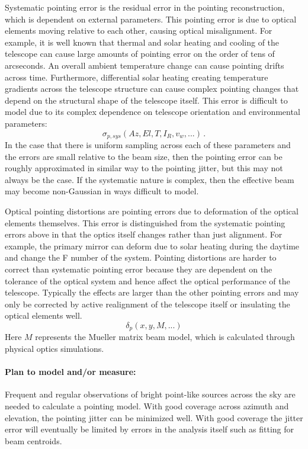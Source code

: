 Systematic pointing error is the residual error in the pointing reconstruction, which is dependent on external parameters. This pointing error is due to optical elements moving relative to each other, causing optical misalignment. For example, it is well known that thermal and solar heating and cooling of the telescope can cause large amounts of pointing error on the order of tens of arcseconds. An overall ambient temperature change can cause pointing drifts across time. Furthermore, differential solar heating creating temperature gradients across the telescope structure can cause complex pointing changes that depend on the structural shape of the telescope itself. This error is difficult to model due to its complex dependence on telescope orientation and environmental parameters:
\begin{equation}
\sigma_{p,sys} \left ( Az, El, T, I_{R}, v_{w}, ... \right ) \, .
\end{equation}
In the case that there is uniform sampling across each of these parameters and the errors are small relative to the beam size, then the pointing error can be roughly approximated in similar way to the pointing jitter, but this may not always be the case. If the systematic nature is complex, then the effective beam may become non-Gaussian in ways difficult to model.

Optical pointing distortions are pointing errors due to deformation of the optical elements themselves. This error is distinguished from the systematic pointing errors above in that the optics itself changes rather than just alignment. For example, the primary mirror can deform due to solar heating during the daytime and change the F number of the system. Pointing distortions are harder to correct than systematic pointing error because they are dependent on the tolerance of the optical system and hence affect the optical performance of the telescope. Typically the effects are larger than the other pointing errors and may only be corrected by active realignment of the telescope itself or insulating the optical elements well.
\begin{equation}
\delta_{p} \left ( x, y, M, ... \right )
\end{equation}
Here $M$ represents the Mueller matrix beam model, which is calculated through physical optics simulations. 

\paragraph{Plan to model and/or measure:}
Frequent and regular observations of bright point-like sources across the sky are needed to calculate a pointing model. With good coverage across azimuth and elevation, the pointing jitter can be minimized well. With good coverage the jitter error will eventually be limited by errors in the analysis itself such as fitting for beam centroids.


